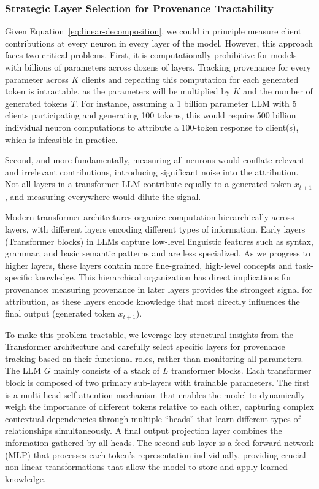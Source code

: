 \subsubsection{Strategic Layer Selection for Provenance Tractability}
Given Equation~\ref{eq:linear-decomposition}, we could in principle measure client contributions at every neuron in every layer of the model.
However, this approach faces two critical problems.
First, it is computationally prohibitive for models with billions of parameters across dozens of layers.
Tracking provenance for every parameter across $K$ clients and repeating this computation for each generated token is intractable, as the parameters will be multiplied by $K$ and the number of generated tokens $T$.
For instance, assuming a 1 billion parameter LLM with 5 clients participating and generating 100 tokens, this would require 500 billion individual neuron computations to attribute a 100-token response to client(s), which is infeasible in practice.

Second, and more fundamentally, measuring all neurons would conflate relevant and irrelevant contributions, introducing significant noise into the attribution.
Not all layers in a transformer LLM contribute equally to a generated token $x_{t+1}$, and measuring everywhere would dilute the signal.

Modern transformer architectures organize computation hierarchically across layers, with different layers encoding different types of information.
Early layers (Transformer blocks) in LLMs capture low-level linguistic features such as syntax, grammar, and basic semantic patterns and are less specialized.
As we progress to higher layers, these layers contain more fine-grained, high-level concepts and task-specific knowledge.
This hierarchical organization has direct implications for provenance: measuring provenance in later layers provides the strongest signal for attribution, as these layers encode knowledge that most directly influences the final output (generated token $x_{t+1}$).

To make this problem tractable, we leverage key structural insights from the Transformer architecture and carefully select specific layers for provenance tracking based on their functional roles, rather than monitoring all parameters.
The LLM $G$ mainly consists of a stack of $L$ transformer blocks.
Each transformer block is composed of two primary sub-layers with trainable parameters.
The first is a multi-head self-attention mechanism that enables the model to dynamically weigh the importance of different tokens relative to each other, capturing complex contextual dependencies through multiple ``heads'' that learn different types of relationships simultaneously.
A final output projection layer combines the information gathered by all heads.
The second sub-layer is a feed-forward network (MLP) that processes each token's representation individually, providing crucial non-linear transformations that allow the model to store and apply learned knowledge.

